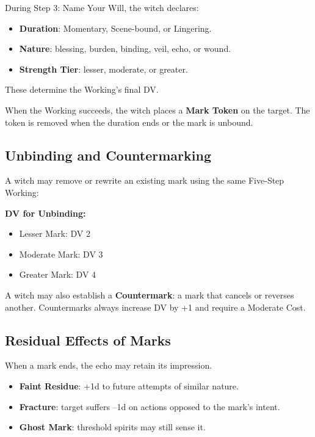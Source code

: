 \documentclass[11pt]{book}
\begin{document}
During Step 3: Name Your Will, the witch declares:

\begin{itemize}
    \item \textbf{Duration}: Momentary, Scene-bound, or Lingering.
    \item \textbf{Nature}: blessing, burden, binding, veil, echo, or wound.
    \item \textbf{Strength Tier}: lesser, moderate, or greater.
\end{itemize}

These determine the Working's final DV.

When the Working succeeds, the witch places a \textbf{Mark Token} on the target.
The token is removed when the duration ends or the mark is unbound.

\subsection*{Unbinding and Countermarking}

A witch may remove or rewrite an existing mark using the same Five-Step Working:

\textbf{DV for Unbinding:}
\begin{itemize}[noitemsep]
    \item Lesser Mark: DV 2
    \item Moderate Mark: DV 3
    \item Greater Mark: DV 4
\end{itemize}

A witch may also establish a \textbf{Countermark}: a mark that cancels or reverses another.
Countermarks always increase DV by +1 and require a Moderate Cost.

\subsection*{Residual Effects of Marks}

When a mark ends, the echo may retain its impression.

\begin{itemize}[noitemsep]
    \item \textbf{Faint Residue}: +1d to future attempts of similar nature.
    \item \textbf{Fracture}: target suffers --1d on actions opposed to the mark's intent.
    \item \textbf{Ghost Mark}: threshold spirits may still sense it.
\end{itemize}
\end{document}

